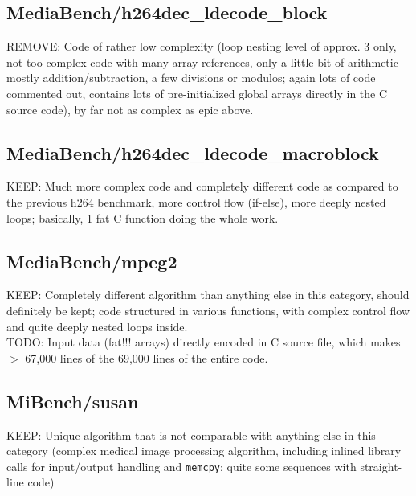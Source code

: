 \documentclass[a4paper]{article}
\begin{document}
\subsection{MediaBench/h264dec\_ldecode\_block}
  REMOVE: Code of rather low complexity (loop nesting level of approx. 3 only, not too complex code with many array references, only a little bit of arithmetic -- mostly addition/subtraction, a few divisions or modulos; again lots of code commented out, contains lots of pre-initialized global arrays directly in the C source code), by far not as complex as epic above.
\subsection{MediaBench/h264dec\_ldecode\_macroblock}
  KEEP: Much more complex code and completely different code as compared to the previous h264 benchmark, more control flow (if-else), more deeply nested loops; basically, 1 fat C function doing the whole work.
\subsection{MediaBench/mpeg2}
  KEEP: Completely different algorithm than anything else in this category, should definitely be kept; code structured in various functions, with complex control flow and quite deeply nested loops inside. \\
  TODO: Input data (fat!!! arrays) directly encoded in C source file, which makes $>$ 67,000 lines of the 69,000 lines of the entire code.
\subsection{MiBench/susan}
  KEEP: Unique algorithm that is not comparable with anything else in this category (complex medical image processing algorithm, including inlined library calls for input/output handling and {\tt memcpy}; quite some sequences with straight-line code)
\end{document}
